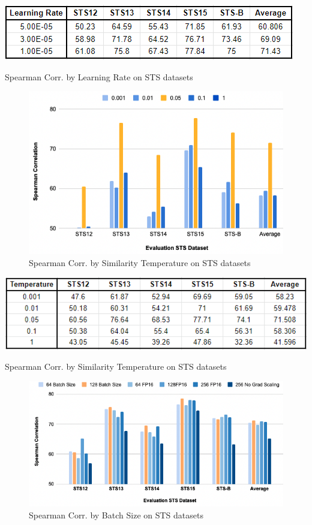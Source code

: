 \documentclass[10pt,twocolumn,letterpaper]{article}
\begin{document}
\begin{appendices}
\begin{table}[hbt!]
\centering
\includegraphics[scale=0.6]{images/Results-Learning-Rate.png}
\caption{Spearman Corr. by Learning Rate on STS datasets}
\label{fig:short}
\end{table}

\begin{figure}[hbt!]
\centering
\includegraphics[scale=0.30]{images/Results-Evaluation-Score-by-Temp.png}
\caption{Spearman Corr. by Similarity Temperature on STS datasets}
\label{fig:short}
\end{figure}

\begin{table}[hbt!]
\centering
\includegraphics[scale=0.55]{images/Results-Temperature.png}
\caption{Spearman Corr. by Similarity Temperature on STS datasets}
\label{fig:short}
\end{table}

\begin{figure}[hbt!]
\centering
\includegraphics[scale=0.35]{images/Results-Evaluation-Score-by-Batch-Size.png}
\caption{Spearman Corr. by Batch Size on STS datasets}
\label{fig:short}
\end{figure}


\end{appendices}
\end{document}
